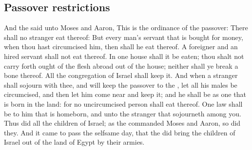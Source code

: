 \begin{biblechapter}
\section*{Passover restrictions}
\verse And the \LORD said unto Moses and Aaron, This is the ordinance of the passover: There shall no stranger eat thereof:
\verse But every man's servant that is bought for money, when thou hast circumcised him, then shall he eat thereof.
\verse A foreigner and an hired servant shall not eat thereof.
\verse In one house shall it be eaten; thou shalt not carry forth ought of the flesh abroad out of the house; neither shall ye break a bone thereof.
\verse All the congregation of Israel shall keep it.
\verse And when a stranger shall sojourn with thee, and will keep the passover to the \LORD, let all his males be circumcised, and then let him come near and keep it; and he shall be as one that is born in the land: for no uncircumcised person shall eat thereof.
\verse One law shall be to him that is homeborn, and unto the stranger that sojourneth among you.
\verse Thus did all the children of Israel; as the \LORD commanded Moses and Aaron, so did they.
\verse And it came to pass the selfsame day, that the \LORD did bring the children of Israel out of the land of Egypt by their armies.
\end{biblechapter}

